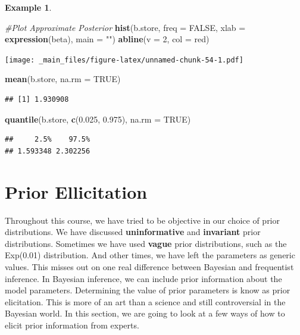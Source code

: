 \documentclass[
]{book}
\newenvironment{Shaded}{\begin{snugshade}}{\end{snugshade}}
\newcommand{\AttributeTok}[1]{\textcolor[rgb]{0.13,0.29,0.53}{#1}}
\newcommand{\CommentTok}[1]{\textcolor[rgb]{0.56,0.35,0.01}{\textit{#1}}}
\newcommand{\ConstantTok}[1]{\textcolor[rgb]{0.56,0.35,0.01}{#1}}
\newcommand{\DecValTok}[1]{\textcolor[rgb]{0.00,0.00,0.81}{#1}}
\newcommand{\FloatTok}[1]{\textcolor[rgb]{0.00,0.00,0.81}{#1}}
\newcommand{\FunctionTok}[1]{\textcolor[rgb]{0.13,0.29,0.53}{\textbf{#1}}}
\newcommand{\NormalTok}[1]{#1}
\newcommand{\StringTok}[1]{\textcolor[rgb]{0.31,0.60,0.02}{#1}}
\theoremstyle{definition}
\theoremstyle{definition}
\newtheorem{example}{Example}[chapter]
\theoremstyle{definition}
\theoremstyle{definition}
\theoremstyle{remark}
\begin{document}
\begin{example}
\begin{Shaded}
\begin{Highlighting}[]
\CommentTok{\#Plot Approximate Posterior}
\FunctionTok{hist}\NormalTok{(b.store, }\AttributeTok{freq =} \ConstantTok{FALSE}\NormalTok{, }\AttributeTok{xlab =} \FunctionTok{expression}\NormalTok{(beta), }\AttributeTok{main =} \StringTok{""}\NormalTok{)}
\FunctionTok{abline}\NormalTok{(}\AttributeTok{v =} \DecValTok{2}\NormalTok{, }\AttributeTok{col =} \StringTok{\textquotesingle{}red\textquotesingle{}}\NormalTok{)}
\end{Highlighting}
\end{Shaded}

\texttt{[image: \_main\_files/figure-latex/unnamed-chunk-54-1.pdf]}

\begin{Shaded}
\begin{Highlighting}[]
\FunctionTok{mean}\NormalTok{(b.store, }\AttributeTok{na.rm =} \ConstantTok{TRUE}\NormalTok{)}
\end{Highlighting}
\end{Shaded}

\begin{verbatim}
## [1] 1.930908
\end{verbatim}

\begin{Shaded}
\begin{Highlighting}[]
\FunctionTok{quantile}\NormalTok{(b.store, }\FunctionTok{c}\NormalTok{(}\FloatTok{0.025}\NormalTok{, }\FloatTok{0.975}\NormalTok{), }\AttributeTok{na.rm =} \ConstantTok{TRUE}\NormalTok{)}
\end{Highlighting}
\end{Shaded}

\begin{verbatim}
##     2.5%    97.5% 
## 1.593348 2.302256
\end{verbatim}

\end{example}

\hypertarget{prior-ellicitation}{%
\section{Prior Ellicitation}\label{prior-ellicitation}}

Throughout this course, we have tried to be objective in our choice of prior distributions. We have discussed \textbf{uninformative} and \textbf{invariant} prior distributions. Sometimes we have used \textbf{vague} prior distributions, such as the Exp(0.01) distribution. And other times, we have left the parameters as generic values. This misses out on one real difference between Bayesian and frequentist inference. In Bayesian inference, we can include prior information about the model parameters. Determining the value of prior parameters is know as prior elicitation. This is more of an art than a science and still controversial in the Bayesian world. In this section, we are going to look at a few ways of how to elicit prior information from experts.
\end{document}
